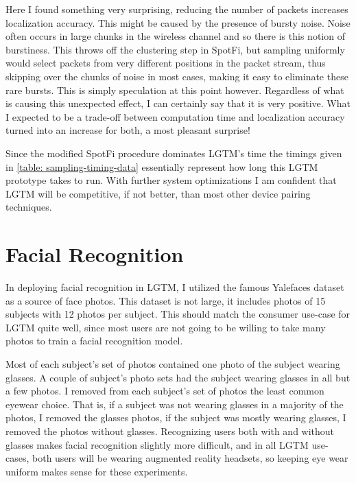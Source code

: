 \documentclass[12pt]{report}
\begin{document}
Here I found something very surprising, reducing the number of packets increases localization accuracy. This might be caused by the presence of bursty noise. Noise often occurs in large chunks in the wireless channel and so there is this notion of burstiness. This throws off the clustering step in SpotFi, but sampling uniformly would select packets from very different positions in the packet stream, thus skipping over the chunks of noise in most cases, making it easy to eliminate these rare bursts. This is simply speculation at this point however. Regardless of what is causing this unexpected effect, I can certainly say that it is very positive. What I expected to be a trade-off between computation time and localization accuracy turned into an increase for both, a most pleasant surprise! \par

Since the modified SpotFi procedure dominates LGTM's time the timings given in \ref{table: sampling-timing-data} essentially represent how long this LGTM prototype takes to run. With further system optimizations I am confident that LGTM will be competitive, if not better, than most other device pairing techniques. \par

\section{Facial Recognition}
In deploying facial recognition in LGTM, I utilized the famous Yalefaces \cite{FisherfacesBelhumeur1997} dataset as a source of face photos. This dataset is not large, it includes photos of 15 subjects with 12 photos per subject. This should match the consumer use-case for LGTM quite well, since most users are not going to be willing to take many photos to train a facial recognition model. \par

Most of each subject's set of photos contained one photo of the subject wearing glasses. A couple of subject's photo sets had the subject wearing glasses in all but a few photos. I removed from each subject's set of photos the least common eyewear choice. That is, if a subject was not wearing glasses in a majority of the photos, I removed the glasses photos, if the subject was mostly wearing glasses, I removed the photos without glasses. Recognizing users both with and without glasses makes facial recognition slightly more difficult, and in all LGTM use-cases, both users will be wearing augmented reality headsets, so keeping eye wear uniform makes sense for these experiments. \par
\end{document}
